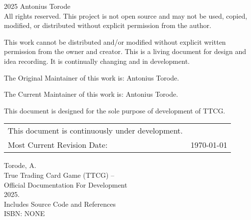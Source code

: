 \pagestyle{empty}
\begingroup
\footnotesize
\parindent 0pt
\parskip \baselineskip
\textcopyright{} 2025 Antonius Torode \\
All rights reserved. This project is not open source and may not be used, copied, modified, or distributed without explicit permission from the author.

This work cannot be distributed and/or modified without explicit written permission from the owner and creator. This is a living document for design and idea recording. It is continually changing and in development.

The Original Maintainer of this work is: Antonius Torode.

The Current Maintainer of this work is: Antonius Torode.

This document is designed for the sole purpose of development of TTCG.


\begin{center}
\begin{tabular}{ll}
This document is continuously under development. \\
Most Current Revision Date: &  \today 
\end{tabular}
\end{center}

\vfill

Torode, A.\\
\hspace*{2em} True Trading Card Game (TTCG) -- \\
\hspace*{2em} Official Documentation For Development \\
\hspace*{2em} 2025. \\
\hspace*{2em} Includes Source Code and References \\
\hspace*{2em} ISBN: NONE \\



\endgroup
\clearpage
